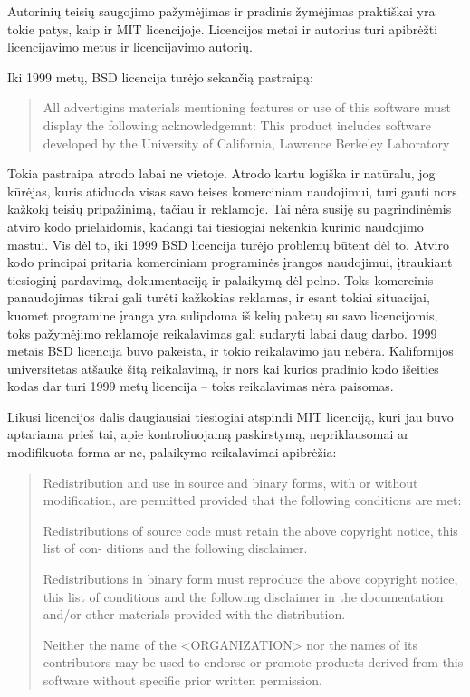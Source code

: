 Autorinių teisių saugojimo pažymėjimas ir pradinis žymėjimas praktiškai yra tokie patys, kaip ir MIT licencijoje.
Licencijos metai ir autorius turi apibrėžti licencijavimo metus ir licencijavimo autorių.

Iki 1999 metų, BSD licencija turėjo sekančią pastraipą:

\begin{quote}
    All advertigins materials mentioning features or use of this software must display the following acknowledgemnt: This product includes software developed by the University of California, Lawrence Berkeley Laboratory
\end{quote}

Tokia pastraipa atrodo labai ne vietoje.
Atrodo kartu logiška ir natūralu, jog kūrėjas, kuris atiduoda visas savo teises komerciniam naudojimui, turi gauti nors kažkokį teisių pripažinimą, tačiau ir reklamoje.
Tai nėra susiję su pagrindinėmis atviro kodo prielaidomis, kadangi tai tiesiogiai nekenkia kūrinio naudojimo mastui.
Vis dėl to, iki 1999 BSD licencija turėjo problemų būtent dėl to.
Atviro kodo principai pritaria komerciniam programinės įrangos naudojimui, įtraukiant tiesioginį pardavimą, dokumentaciją ir palaikymą dėl pelno.
Toks komercinis panaudojimas tikrai gali turėti kažkokias reklamas, ir esant tokiai situacijai, kuomet programine įranga yra sulipdoma iš kelių paketų su savo licencijomis, toks pažymėjimo reklamoje reikalavimas gali sudaryti labai daug darbo.
1999 metais BSD licencija buvo pakeista, ir tokio reikalavimo jau nebėra.
Kalifornijos universitetas atšaukė šitą reikalavimą, ir nors kai kurios pradinio kodo išeities kodas dar turi 1999 metų licencija -- toks reikalavimas nėra paisomas.

Likusi licencijos dalis daugiausiai tiesiogiai atspindi MIT licenciją, kuri jau buvo aptariama prieš tai, apie kontroliuojamą paskirstymą, nepriklausomai ar modifikuota forma ar ne, palaikymo reikalavimai apibrėžia:

\begin{quote}
    Redistribution and use in source and binary forms, with or without modification, are permitted provided that the following conditions are met:

    Redistributions of source code must retain the above copyright notice, this list of con- ditions and the following disclaimer.
    
    Redistributions in binary form must reproduce the above copyright notice, this list of conditions and the following disclaimer in the documentation and/or other materials provided with the distribution.
    
    Neither the name of the <ORGANIZATION> nor the names of its contributors may be used to endorse or promote products derived from this software without specific prior written permission.
\end{quote}

